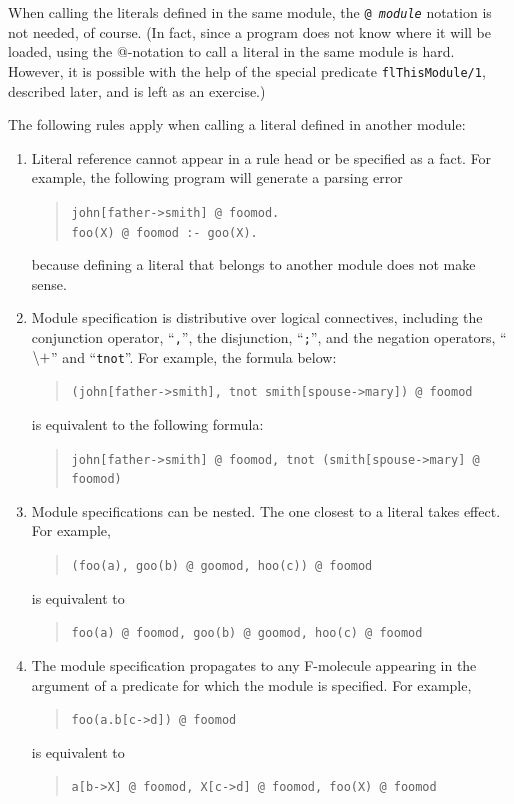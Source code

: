 \documentclass[11pt]{article}
\newcommand{\NAF}{{$\tt\backslash +$}\xspace}
\begin{document}
When calling the literals defined in the same module, the {\tt @{\it
    module}} notation is not needed, of course. (In fact, since a program
does not know where it will be loaded, using the @-notation to call a
literal in the same module is hard. However, it is possible with the help
of the special predicate {\tt flThisModule/1}, described later, and is left
as an exercise.)

The following rules apply when calling a literal defined in another module:
\begin{enumerate}
\item Literal reference cannot appear in a rule head or be specified as
  a fact. For example, the following program will generate
  a parsing error
  \begin{quote}
    \verb|john[father->smith] @ foomod.| \\
    \verb|foo(X) @ foomod :- goo(X).|
  \end{quote}
  because defining a literal that belongs to another module does not make
  sense.
  
\item Module specification is distributive over logical connectives,
  including the conjunction operator, ``\verb|,|'', the disjunction,
  ``\verb|;|'', and the negation operators, ``\NAF'' and
  ``\verb|tnot|''. For example, the formula below:
  \begin{quote}
    \verb|(john[father->smith], tnot smith[spouse->mary]) @ foomod|
  \end{quote}
  is equivalent to the following formula:
  \begin{quote}
    \verb|john[father->smith] @ foomod, tnot (smith[spouse->mary] @ foomod)|
  \end{quote}

\item Module specifications can be nested. The one closest to a literal
  takes effect. For example,
  \begin{quote}
    \verb|(foo(a), goo(b) @ goomod, hoo(c)) @ foomod|
  \end{quote}
  is equivalent to
  \begin{quote}
    \verb|foo(a) @ foomod, goo(b) @ goomod, hoo(c) @ foomod|
  \end{quote}
  
\item The module specification propagates to any F-molecule appearing
  in the argument of a predicate for which the module is
  specified. For example,
  \begin{quote}
    \verb|foo(a.b[c->d]) @ foomod|
  \end{quote}
  is equivalent to
  \begin{quote}
    \verb|a[b->X] @ foomod, X[c->d] @ foomod, foo(X) @ foomod|
  \end{quote}
  

\end{enumerate}
\end{document}

